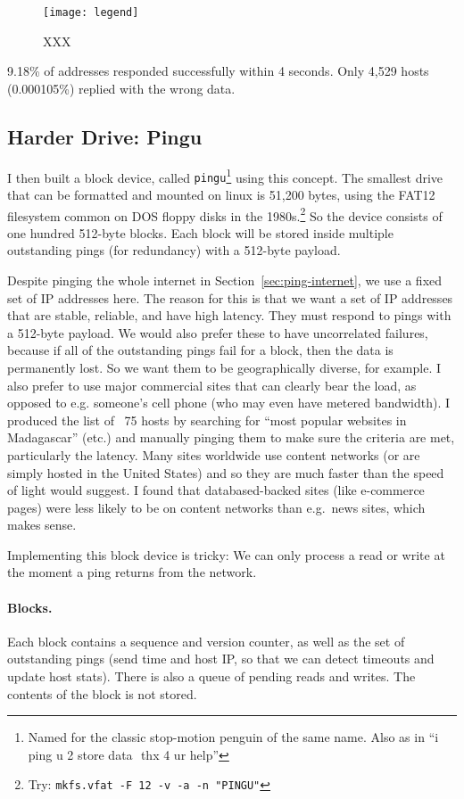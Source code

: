 \documentclass[twocolumn]{article}
\begin{document}
\begin{figure}[htp]
  \texttt{[image: legend]}
  \caption{ XXX } \label{fig:internetlegend}
\end{figure}

9.18\% of addresses responded successfully within 4 seconds. Only
4,529 hosts (0.000105\%) replied with the wrong data.

\subsection{Harder Drive: Pingu} \label{sec:pingu}

I then built a block device, called {\tt pingu}\footnote{Named for the
  classic stop-motion penguin of the same name. Also as in ``i ping u
  2 store data\,\, thx 4 ur help''} using this concept. The smallest
drive that can be formatted and mounted on linux is 51,200 bytes,
using the FAT12 filesystem common on DOS floppy disks in the
1980s.\cite{wikipediafat12}\footnote{ Try: \verb+mkfs.vfat -F 12 -v -a -n "PINGU"+ } So
the device consists of one hundred 512-byte blocks. Each block will
be stored inside multiple outstanding pings (for redundancy) with
a 512-byte payload.

Despite pinging the whole internet in Section~\ref{sec:ping-internet},
we use a fixed set of IP addresses here. The reason for this is that
we want a set of IP addresses that are stable, reliable, and have high
latency. They must respond to pings with a 512-byte payload. We would
also prefer these to have uncorrelated failures, because if all of the
outstanding pings fail for a block, then the data is permanently lost.
So we want them to be geographically diverse, for example. I also
prefer to use major commercial sites that can clearly bear the load,
as opposed to e.g. someone's cell phone (who may even have metered
bandwidth). I produced the list of ~75 hosts by searching for ``most
popular websites in Madagascar'' (etc.) and manually pinging them to
make sure the criteria are met, particularly the latency. Many sites
worldwide use content networks (or are simply hosted in the United
States) and so they are much faster than the speed of light would
suggest. I found that databased-backed sites (like e-commerce pages)
were less likely to be on content networks than e.g.~news sites, which
makes sense.

Implementing this block device is tricky: We can only process a read
or write at the moment a ping returns from the network.

\paragraph{Blocks.} Each block contains a sequence and version counter,
as well as the set of outstanding pings (send time and host IP, so that
we can detect timeouts and update host stats). There is also a queue
of pending reads and writes. The contents of the block is not stored.
\end{document}
